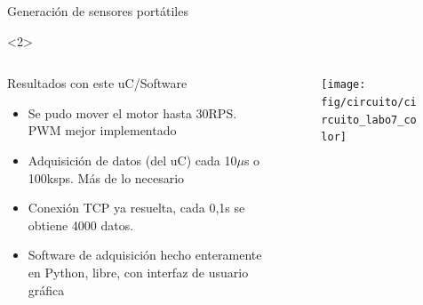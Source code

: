 \begin{frame}{Generación de sensores portátiles}
    \begin{onlyenv}<2>
        \begin{columns}
            \begin{column}{0.7\textwidth}
                \begin{block}{Resultados con este uC/Software}
                    \begin{itemize}
                        \item Se pudo mover el motor hasta 30RPS. \\PWM mejor implementado
                        \item Adquisición de datos (del uC) cada 10$\mu$s o 100ksps. Más de lo necesario
                        \item Conexión TCP ya resuelta, cada 0,1s se obtiene 4000 datos. 
                        \item Software de adquisición hecho enteramente en Python, libre, con interfaz de usuario gráfica
                    \end{itemize}
                \end{block}
            \end{column}
            \begin{column}{0.3\textwidth}
                \begin{figure}
                    \texttt{[image: fig/circuito/circuito\_labo7\_color]}
                    \label{fig:circuito/circuito_labo7_color}
                \end{figure}
            \end{column}
        \end{columns}
    \end{onlyenv}

\end{frame}


